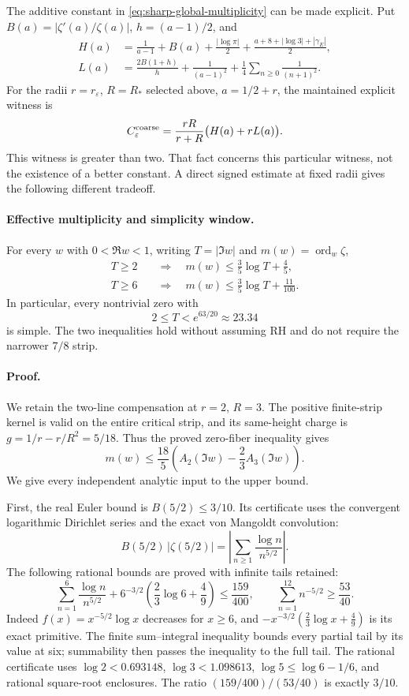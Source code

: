 The additive constant in \eqref{eq:sharp-global-multiplicity} can be
made explicit. Put \(B(a)=|\zeta'(a)/\zeta(a)|\),
\(h=(a-1)/2\), and
\begin{align*}
 H(a)&=\frac1{a-1}+B(a)+\frac{|\log\pi|}{2}
       +\frac{a+8+|\log3|+|\gamma_E|}{2},\\
 L(a)&=\frac{2B(1+h)}h+\frac1{(a-1)^2}
           +\frac14\sum_{n\ge0}\frac1{(n+1)^2}.
\end{align*}
For the radii \(r=r_\varepsilon\), \(R=R_*\) selected above,
\(a=1/2+r\), the maintained explicit witness is
\[
 C_\varepsilon^{\rm coarse}
       =\frac{rR}{r+R}\bigl(H(a)+rL(a)\bigr).
\]
This witness is greater than two. That fact concerns this particular
witness, not the existence of a better constant. A direct signed
estimate at fixed radii gives the following different tradeoff.

\paragraph{Effective multiplicity and simplicity window.}
For every \(w\) with \(0<\Re w<1\), writing
\(T=|\Im w|\) and \(m(w)=\operatorname{ord}_w\zeta\),
\begin{align*}
 T\ge2&\quad\Longrightarrow\quad
       m(w)\le\frac35\log T+\frac45,\\
 T\ge6&\quad\Longrightarrow\quad
       m(w)\le\frac35\log T+\frac{11}{100}.
\end{align*}
In particular, every nontrivial zero with
\[
                   2\le T<e^{63/20}\approx23.34
\]
is simple. The two inequalities hold without assuming RH and do not
require the narrower \(7/8\) strip.

\paragraph{Proof.}
We retain the two-line compensation at \(r=2\), \(R=3\).
The positive finite-strip kernel is valid on the entire critical strip,
and its same-height charge is \(g=1/r-r/R^2=5/18\).
Thus the proved zero-fiber inequality gives
\[
 m(w)\le\frac{18}{5}\left(A_2(\Im w)-\frac23A_3(\Im w)\right).
\]
We give every independent analytic input to the upper bound.

First, the real Euler bound is
\(B(5/2)\le3/10\). Its certificate uses the convergent logarithmic
Dirichlet series and the exact von Mangoldt convolution:
\[
 B(5/2)\,|\zeta(5/2)|
     =\left|\sum_{n\ge1}\frac{\log n}{n^{5/2}}\right|.
\]
The following rational bounds are proved with infinite tails retained:
\[
 \sum_{n=1}^{6}\frac{\log n}{n^{5/2}}
   +6^{-3/2}\left(\frac23\log6+\frac49\right)
       \le\frac{159}{400},\qquad
 \sum_{n=1}^{12}n^{-5/2}\ge\frac{53}{40}.
\]
Indeed \(f(x)=x^{-5/2}\log x\) decreases for \(x\ge6\), and
\(-x^{-3/2}(\frac23\log x+\frac49)\) is its exact primitive.
The finite sum--integral inequality bounds every partial tail by its
value at six; summability then passes the inequality to the full tail.
The rational certificate uses
\(\log2<0.693148\), \(\log3<1.098613\),
\(\log5\le\log6-1/6\), and rational square-root enclosures.
The ratio \((159/400)/(53/40)\) is exactly \(3/10\).

